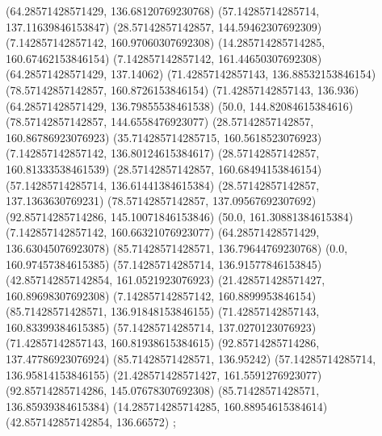 {{{		(64.28571428571429, 136.68120769230768)
		(57.14285714285714, 137.11639846153847)
		(28.57142857142857, 144.59462307692309)
		(7.142857142857142, 160.97060307692308)
		(14.285714285714285, 160.67462153846154)
		(7.142857142857142, 161.44650307692308)
		(64.28571428571429, 137.14062)
		(71.42857142857143, 136.88532153846154)
		(78.57142857142857, 160.8726153846154)
		(71.42857142857143, 136.936)
		(64.28571428571429, 136.79855538461538)
		(50.0, 144.82084615384616)
		(78.57142857142857, 144.6558476923077)
		(28.57142857142857, 160.86786923076923)
		(35.714285714285715, 160.5618523076923)
		(7.142857142857142, 136.80124615384617)
		(28.57142857142857, 160.81333538461539)
		(28.57142857142857, 160.68494153846154)
		(57.14285714285714, 136.61441384615384)
		(28.57142857142857, 137.1363630769231)
		(78.57142857142857, 137.09567692307692)
		(92.85714285714286, 145.10071846153846)
		(50.0, 161.30881384615384)
		(7.142857142857142, 160.66321076923077)
		(64.28571428571429, 136.63045076923078)
		(85.71428571428571, 136.79644769230768)
		(0.0, 160.97457384615385)
		(57.14285714285714, 136.91577846153845)
		(42.857142857142854, 161.0521923076923)
		(21.428571428571427, 160.89698307692308)
		(7.142857142857142, 160.8899953846154)
		(85.71428571428571, 136.91848153846155)
		(71.42857142857143, 160.83399384615385)
		(57.14285714285714, 137.0270123076923)
		(71.42857142857143, 160.81938615384615)
		(92.85714285714286, 137.47786923076924)
		(85.71428571428571, 136.95242)
		(57.14285714285714, 136.95814153846155)
		(21.428571428571427, 161.5591276923077)
		(92.85714285714286, 145.07678307692308)
		(85.71428571428571, 136.85939384615384)
		(14.285714285714285, 160.88954615384614)
		(42.857142857142854, 136.66572)
	};

}}
